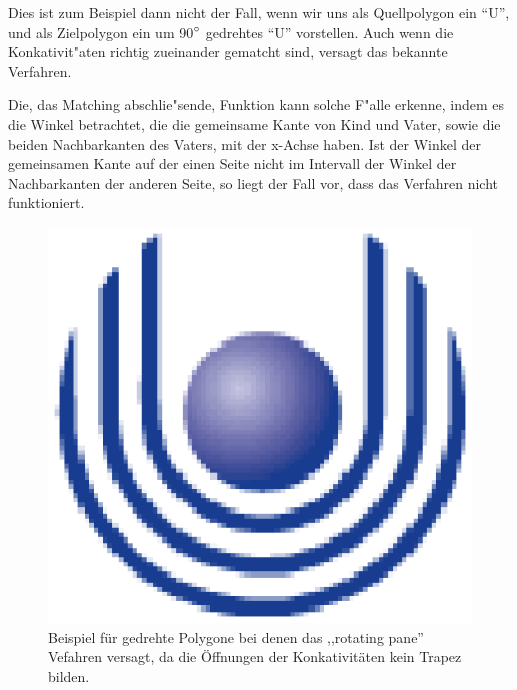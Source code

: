 Dies ist zum Beispiel dann nicht der Fall, wenn wir uns als Quellpolygon ein "`U"', und als Zielpolygon ein um 90$\degree$ gedrehtes "`U"' vorstellen. Auch wenn die Konkativit"aten richtig zueinander gematcht sind, versagt das bekannte Verfahren.

Die, das Matching abschlie"sende, Funktion kann solche F"alle erkenne, indem es die Winkel betrachtet, die die gemeinsame Kante von Kind und Vater, sowie die beiden Nachbarkanten des Vaters, mit der x-Achse haben. Ist der Winkel der gemeinsamen Kante auf der einen Seite nicht im  Intervall der Winkel der Nachbarkanten der anderen Seite, so liegt der Fall vor, dass das Verfahren nicht funktioniert.

\begin{figure}
	\centering
	\includegraphics{feu_logo2.eps}
	\caption[Beispiel für gedrehte Polygone]{Beispiel für gedrehte Polygone bei denen das ,,rotating pane'' Vefahren versagt, da die Öffnungen der Konkativitäten kein Trapez bilden.}
	\label{fig:gedrehteMatches}
\end{figure}


